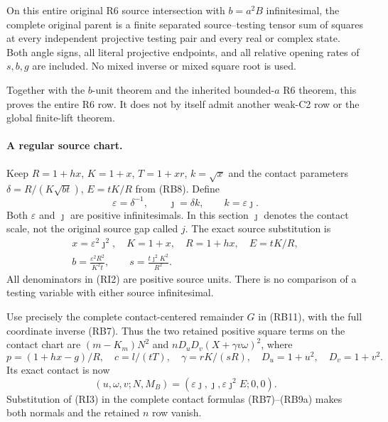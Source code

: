 \begin{theorem}
On this entire original R6 source intersection with $b=a^2B$
infinitesimal, the complete original parent is a finite separated
source--testing tensor sum of squares at every independent projective
testing pair and every real or complex state. Both angle signs, all
literal projective endpoints, and all relative opening rates of
$s,b,g$ are included. No mixed inverse or mixed square root is used.
\end{theorem}

Together with the $b$-unit theorem and the inherited bounded-$a$
R6 theorem, this proves the entire R6 row. It does not by itself
admit another weak-C2 row or the global finite-lift theorem.

\paragraph{A regular source chart.}
Keep $R=1+hx$, $K=1+x$, $T=1+xr$, $k=\sqrt{x}$ and the contact
parameters $\delta=R/(K\sqrt{bt})$, $E=tK/R$ from (RB8). Define
\[
 \varepsilon=\delta^{-1},\qquad \jmath=\delta k,
 \qquad k=\varepsilon\jmath.
 \tag{RI1}
\]
Both $\varepsilon$ and $\jmath$ are positive infinitesimals. In this
section $\jmath$ denotes the contact scale, not the original source
gap called $j$. The exact source substitution is
\[
 \begin{gathered}
 x=\varepsilon^2\jmath^2,\quad K=1+x,\quad R=1+hx,\quad
 E=tK/R,\\
 b=\frac{\varepsilon^2R^2}{K^2t},\qquad
 s=\frac{t\jmath^2K^2}{R^2}.
 \end{gathered}                                                   \tag{RI2}
\]
All denominators in (RI2) are positive source units. There is no
comparison of a testing variable with either source infinitesimal.

Use precisely the complete contact-centered remainder $G$ in (RB11),
with the full coordinate inverse (RB7). Thus the two retained positive square terms
on the contact chart are $(m-K_m)N^2$ and
$nD_uD_v(X+\gamma v\omega)^2$, where
\[
 p=(1+hx-g)/R,\quad c=l/(tT),\quad
 \gamma=rK/(sR),\quad D_u=1+u^2,\quad D_v=1+v^2.
\]
Its exact contact is now
\[
 (u,\omega,v;N,M_B)
   =(\varepsilon\jmath,\jmath,\varepsilon\jmath^2E;0,0).
 \tag{RI3}
\]
Substitution of (RI3) in the complete contact formulas
(RB7)--(RB9a) makes both normals and the retained $n$ row vanish.

